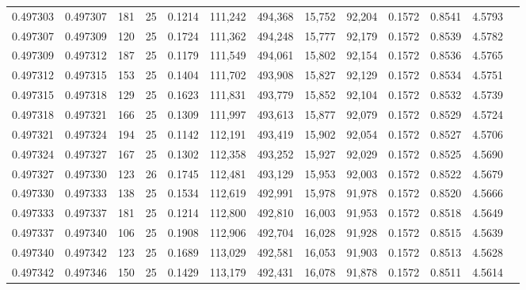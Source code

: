 \begin{tabular}{rrrrrrrrrrrrr}
0.497303 & 0.497307 & 181 &  25 &                                     0.1214 & 111,242 & 494,368 &  15,752 &  92,204 & 0.1572 & 0.8541 & 4.5793 \\
0.497307 & 0.497309 & 120 &  25 &                                     0.1724 & 111,362 & 494,248 &  15,777 &  92,179 & 0.1572 & 0.8539 & 4.5782 \\
0.497309 & 0.497312 & 187 &  25 &                                     0.1179 & 111,549 & 494,061 &  15,802 &  92,154 & 0.1572 & 0.8536 & 4.5765 \\
0.497312 & 0.497315 & 153 &  25 &                                     0.1404 & 111,702 & 493,908 &  15,827 &  92,129 & 0.1572 & 0.8534 & 4.5751 \\
0.497315 & 0.497318 & 129 &  25 &                                     0.1623 & 111,831 & 493,779 &  15,852 &  92,104 & 0.1572 & 0.8532 & 4.5739 \\
0.497318 & 0.497321 & 166 &  25 &                                     0.1309 & 111,997 & 493,613 &  15,877 &  92,079 & 0.1572 & 0.8529 & 4.5724 \\
0.497321 & 0.497324 & 194 &  25 &                                     0.1142 & 112,191 & 493,419 &  15,902 &  92,054 & 0.1572 & 0.8527 & 4.5706 \\
0.497324 & 0.497327 & 167 &  25 &                                     0.1302 & 112,358 & 493,252 &  15,927 &  92,029 & 0.1572 & 0.8525 & 4.5690 \\
0.497327 & 0.497330 & 123 &  26 &                                     0.1745 & 112,481 & 493,129 &  15,953 &  92,003 & 0.1572 & 0.8522 & 4.5679 \\
0.497330 & 0.497333 & 138 &  25 &                                     0.1534 & 112,619 & 492,991 &  15,978 &  91,978 & 0.1572 & 0.8520 & 4.5666 \\
0.497333 & 0.497337 & 181 &  25 &                                     0.1214 & 112,800 & 492,810 &  16,003 &  91,953 & 0.1572 & 0.8518 & 4.5649 \\
0.497337 & 0.497340 & 106 &  25 &                                     0.1908 & 112,906 & 492,704 &  16,028 &  91,928 & 0.1572 & 0.8515 & 4.5639 \\
0.497340 & 0.497342 & 123 &  25 &                                     0.1689 & 113,029 & 492,581 &  16,053 &  91,903 & 0.1572 & 0.8513 & 4.5628 \\
0.497342 & 0.497346 & 150 &  25 &                                     0.1429 & 113,179 & 492,431 &  16,078 &  91,878 & 0.1572 & 0.8511 & 4.5614 \\

\end{tabular}

